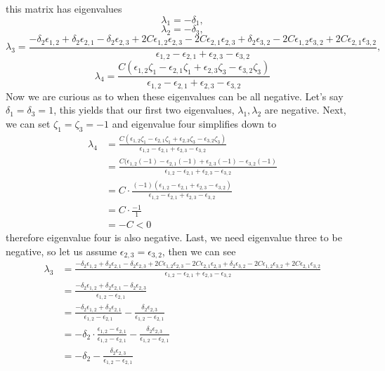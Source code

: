 \documentclass{article}
\begin{document}
this matrix has eigenvalues
\[
    \lambda_1 = -\delta_1,
\]
\[
    \lambda_2 = -\delta_3,
\]
\[
    \lambda_3 = \frac{-\delta_2 \epsilon_{1,2} + \delta_2 \epsilon_{2,1} - \delta_2 \epsilon_{2,3} + 2 C \epsilon_{1,2} \epsilon_{2,3} - 2 C \epsilon_{2,1} \epsilon_{2,3} + \delta_2 \epsilon_{3,2} - 2 C \epsilon_{1,2} \epsilon_{3,2} + 2 C \epsilon_{2,1} \epsilon_{3,2}}{\epsilon_{1,2} - \epsilon_{2,1} + \epsilon_{2,3} - \epsilon_{3,2}},
\]
\[
    \lambda_4 = \frac{C (\epsilon_{1,2} \zeta_1 - \epsilon_{2,1} \zeta_1 + \epsilon_{2,3} \zeta_3 - \epsilon_{3,2} \zeta_3)}{\epsilon_{1,2} - \epsilon_{2,1} + \epsilon_{2,3} - \epsilon_{3,2}}
\]
Now we are curious as to when these eigenvalues can be all negative. Let's say $\delta_1 = \delta_3 = 1$, this yields that our first two eigenvalues, $\lambda_1, \lambda_2$ are negative. Next, we can set $\zeta_1 = \zeta_3 = -1$ and eigenvalue four simplifies down to
\begin{align*}
    \lambda_4 &=
    \frac{C (\epsilon_{1,2} \zeta_1 - \epsilon_{2,1} \zeta_1 + \epsilon_{2,3} \zeta_3 - \epsilon_{3,2} \zeta_3)}{\epsilon_{1,2} - \epsilon_{2,1} + \epsilon_{2,3} - \epsilon_{3,2}} \\
    &= 
    \frac{C (\epsilon_{1,2} (-1) - \epsilon_{2,1} (-1) + \epsilon_{2,3} (-1) - \epsilon_{3,2} (-1)}{\epsilon_{1,2} - \epsilon_{2,1} + \epsilon_{2,3} - \epsilon_{3,2}} \\
    &= C \cdot \frac{(-1)(\epsilon_{1,2} - \epsilon_{2,1} + \epsilon_{2,3} - \epsilon_{3,2})}{\epsilon_{1,2} - \epsilon_{2,1} + \epsilon_{2,3} - \epsilon_{3,2}} \\
    &= C \cdot \frac{-1}{1} \\
    &= -C < 0
\end{align*}
therefore eigenvalue four is also negative. Last, we need eigenvalue three to be negative, so let us assume $\epsilon_{2,3} = \epsilon_{3,2}$, then we can see
\begin{align*}
    \lambda_3 &= 
    \frac{-\delta_2 \epsilon_{1,2} + \delta_2 \epsilon_{2,1} - \delta_2 \epsilon_{2,3} + 2 C \epsilon_{1,2} \epsilon_{2,3} - 2 C \epsilon_{2,1} \epsilon_{2,3} + \delta_2 \epsilon_{3,2} - 2 C \epsilon_{1,2} \epsilon_{3,2} + 2 C \epsilon_{2,1} \epsilon_{3,2}}{\epsilon_{1,2} - \epsilon_{2,1} + \epsilon_{2,3} - \epsilon_{3,2}} \\
    &=
    \frac{-\delta_2 \epsilon_{1,2} + \delta_2 \epsilon_{2,1} - \delta_2 \epsilon_{2,3}}{\epsilon_{1,2} - \epsilon_{2,1}} \\
    &= \frac{-\delta_2 \epsilon_{1,2} + \delta_2 \epsilon_{2,1}}{\epsilon_{1,2} - \epsilon_{2,1}} - \frac{\delta_2 \epsilon_{2,3}}{\epsilon_{1,2} - \epsilon_{2,1}} \\
    &= -\delta_2 \cdot \frac{\epsilon_{1,2} - \epsilon_{2,1}}{\epsilon_{1,2} - \epsilon_{2,1}} - \frac{\delta_2 \epsilon_{2,3}}{\epsilon_{1,2} - \epsilon_{2,1}} \\
    &= -\delta_2 - \frac{\delta_2 \epsilon_{2,3}}{\epsilon_{1,2} - \epsilon_{2,1}}
\end{align*}
\end{document}
